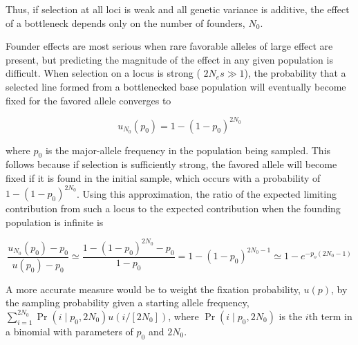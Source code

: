 \documentclass{article}
\begin{document}
{Thus, if selection at all loci is weak and all genetic variance is additive, the effect of a bottleneck depends only on the number of founders,  $ N_{0} $.

Founder effects are most serious when rare favorable alleles of large effect are present, but predicting the magnitude of the effect in any given population is difficult. When selection on a locus is strong ( $ 2N_{e}s \gg 1 $), the probability that a selected line formed from a bottlenecked base population will eventually become fixed for the favored allele converges to

\begin{equation}
u_{N_{0}}(p_{0})=1-(1-p_{0})^{2N_{0}}
\tag{26.25a}
\label{eq:26_25a}
\end{equation}

where  $ p_0 $ is the major-allele frequency in the population being sampled. This follows because if selection is sufficiently strong, the favored allele will become fixed if it is found in the initial sample, which occurs with a probability of  $ 1 - (1 - p_0)^{2N_0} $. Using this approximation, the ratio of the expected limiting contribution from such a locus to the expected contribution when the founding population is infinite is

\begin{equation}
\frac{u_{N_{0}}(p_{0})-p_{0}}{u(p_{0})-p_{0}}\simeq\frac{1-(1-p_{0})^{2N_{0}}-p_{0}}{1-p_{0}}=1-(1-p_{0})^{2N_{0}-1}\simeq1-e^{-p_{o}(2N_{0}-1)}
\tag{26.25b}
\label{eq:26_25b}
\end{equation}

A more accurate measure would be to weight the fixation probability,  $ u(p) $, by the sampling probability given a starting allele frequency,  $ \sum_{i=1}^{2N_0} \Pr(i \mid p_0, 2N_0) u(i / [2N_0]) $, where  $ \Pr(i \mid p_0, 2N_0) $ is the  $ i $th term in a binomial with parameters of  $ p_0 $ and  $ 2N_0 $.

}
\end{document}
